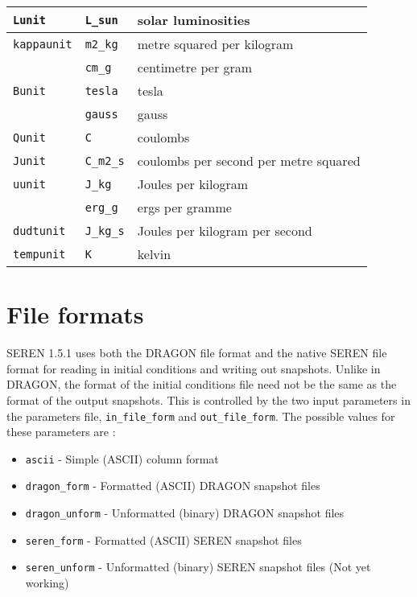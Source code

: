 \documentclass[a4paper]{article}
\newcommand{\VERNO}{1.5.1 }
\newcommand{\var}[1]{\texttt{#1}}
\begin{document}
\begin{center}
\begin{supertabular}{|p{3cm}|p{3cm}|p{6cm}|}
\var{Lunit}     & \var{L\_sun}    & solar luminosities \\ \hline
\var{kappaunit} & \var{m2\_kg}    & metre squared per kilogram \\
                & \var{cm\_g}     & centimetre per gram \\ 
\hline
\var{Bunit}     & \var{tesla}     & tesla \\
                & \var{gauss}     & gauss \\
\hline
\var{Qunit}     & \var{C}         & coulombs \\
\hline
\var{Junit}     & \var{C\_m2\_s}  & coulombs per second per metre squared \\
\hline
\var{uunit}     & \var{J\_kg}     & Joules per kilogram \\
                & \var{erg\_g}    & ergs per gramme \\ \hline
\var{dudtunit}  & \var{J\_kg\_s}  & Joules per kilogram per second \\ \hline
\var{tempunit}  & \var{K}         & kelvin \\
\end{supertabular}
\end{center}


\newpage


\section{File formats}
SEREN \VERNO uses both the DRAGON file format and the native SEREN file format for reading in initial conditions and writing out snapshots.  Unlike in DRAGON, the format of the initial conditions file need not be the same as the format of the output snapshots.  This is controlled by the two input parameters in the parameters file, \var{in\_file\_form} and \var{out\_file\_form}.  The possible values for these parameters are : 
\begin{itemize}
\item \var{ascii} - Simple (ASCII) column format
\item \var{dragon\_form} - Formatted (ASCII) DRAGON snapshot files
\item \var{dragon\_unform} - Unformatted (binary) DRAGON snapshot files
\item \var{seren\_form} - Formatted (ASCII) SEREN snapshot files
\item \var{seren\_unform} - Unformatted (binary) SEREN snapshot files (Not yet working)
\end{itemize}
\end{document}
